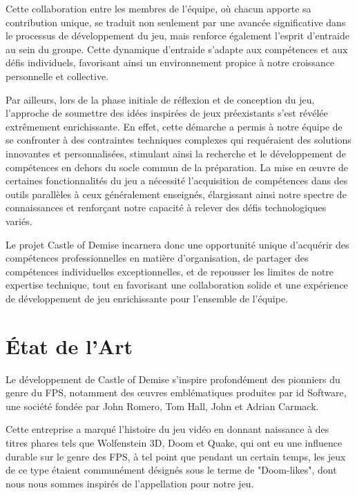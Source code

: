 \documentclass{report}
\begin{document}
Cette collaboration entre les membres de l’équipe, où chacun apporte sa contribution unique, se traduit non seulement par une avancée significative dans le processus de développement du jeu, mais renforce également l’esprit d’entraide au sein du groupe.
Cette dynamique d’entraide s’adapte aux compétences et aux défis individuels, favorisant ainsi un environnement propice à notre croissance personnelle et collective. \newline


Par ailleurs, lors de la phase initiale de réflexion et de conception du jeu, l’approche de soumettre des idées inspirées de jeux préexistants s’est révélée extrêmement enrichissante. En effet, cette démarche a permis à notre équipe de se confronter à des contraintes techniques complexes qui requéraient des solutions innovantes et personnalisées, stimulant ainsi la recherche et le développement de compétences en dehors du socle commun de la préparation.
La mise en œuvre de certaines fonctionnalités du jeu a nécessité l’acquisition de compétences dans des outils parallèles à ceux généralement enseignés, élargissant ainsi notre spectre de connaissances et renforçant notre capacité à relever des défis technologiques variés. \newline

Le projet Castle of Demise incarnera donc une opportunité unique d’acquérir des compétences professionnelles en matière d’organisation, de partager des compétences individuelles exceptionnelles, et de repousser les limites de notre expertise technique, tout en favorisant une collaboration solide et une expérience de développement de jeu enrichissante pour l’ensemble de l’équipe.

\section{État de l'Art}

Le développement de Castle of Demise s’inspire profondément des pionniers du genre du FPS, notamment des œuvres emblématiques produites par id Software, une société fondée par John Romero, Tom Hall, John et Adrian Carmack. \newline 

Cette entreprise a marqué l’histoire du jeu vidéo en donnant naissance à des titres phares tels que Wolfenstein 3D, Doom et Quake, qui ont eu une influence durable sur le genre des FPS, à tel point que pendant un certain temps, les jeux de ce type étaient communément désignés sous le terme de "Doom-likes", dont nous nous sommes inspirés de l’appellation pour notre jeu. \newline
\end{document}

